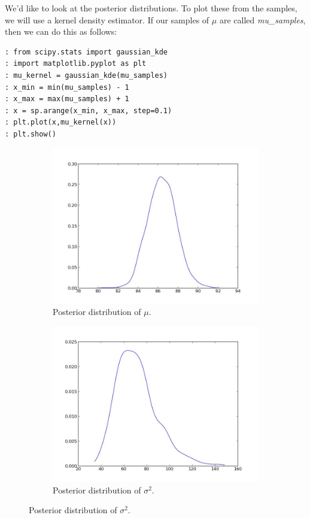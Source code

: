 We'd like to look at the posterior distributions. To plot these from the samples, we will use a kernel density estimator. If our samples of $\mu$ are called \emph{mu\_samples}, then we can do this as follows:

\begin{lstlisting}[style=python]
: from scipy.stats import gaussian_kde
: import matplotlib.pyplot as plt
: mu_kernel = gaussian_kde(mu_samples)
: x_min = min(mu_samples) - 1
: x_max = max(mu_samples) + 1
: x = sp.arange(x_min, x_max, step=0.1)
: plt.plot(x,mu_kernel(x))
: plt.show()
\end{lstlisting}

\begin{figure}
	\centering
	\begin{subfigure}[b]{.49\textwidth}
		\centering
		\includegraphics[width=\textwidth]{mu_posterior.jpeg}
		\caption{Posterior distribution of $\mu$.}
	\end{subfigure}
	\begin{subfigure}[b]{.49\textwidth}
		\centering
		\includegraphics[width=\textwidth]{sigma2_posterior.jpeg}
		\caption{Posterior distribution of $\sigma^2$.}
	\end{subfigure}
\end{figure}

